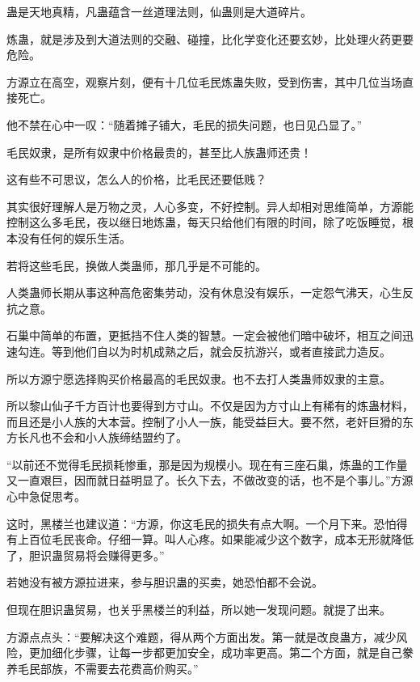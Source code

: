 
\begin{this_body}



蛊是天地真精，凡蛊蕴含一丝道理法则，仙蛊则是大道碎片。

炼蛊，就是涉及到大道法则的交融、碰撞，比化学变化还要玄妙，比处理火药更要危险。

方源立在高空，观察片刻，便有十几位毛民炼蛊失败，受到伤害，其中几位当场直接死亡。

他不禁在心中一叹：“随着摊子铺大，毛民的损失问题，也日见凸显了。”

毛民奴隶，是所有奴隶中价格最贵的，甚至比人族蛊师还贵！

这有些不可思议，怎么人的价格，比毛民还要低贱？

其实很好理解人是万物之灵，人心多变，不好控制。异人却相对思维简单，方源能控制这么多毛民，夜以继日地炼蛊，每天只给他们有限的时间，除了吃饭睡觉，根本没有任何的娱乐生活。

若将这些毛民，换做人类蛊师，那几乎是不可能的。

人类蛊师长期从事这种高危密集劳动，没有休息没有娱乐，一定怨气沸天，心生反抗之意。

石巢中简单的布置，更抵挡不住人类的智慧。一定会被他们暗中破坏，相互之间迅速勾连。等到他们自以为时机成熟之后，就会反抗游兴，或者直接武力造反。

所以方源宁愿选择购买价格最高的毛民奴隶。也不去打人类蛊师奴隶的主意。

所以黎山仙子千方百计也要得到方寸山。不仅是因为方寸山上有稀有的炼蛊材料，而且还是小人族的大本营。控制了小人一族，能受益巨大。要不然，老奸巨猾的东方长凡也不会和小人族缔结盟约了。

“以前还不觉得毛民损耗惨重，那是因为规模小。现在有三座石巢，炼蛊的工作量又一直艰巨，因而就日益明显了。长久下去，不做改变的话，也不是个事儿。”方源心中急促思考。

这时，黑楼兰也建议道：“方源，你这毛民的损失有点大啊。一个月下来。恐怕得有上百位毛民丧命。仔细一算。叫人心疼。如果能减少这个数字，成本无形就降低了，胆识蛊贸易将会赚得更多。”

若她没有被方源拉进来，参与胆识蛊的买卖，她恐怕都不会说。

但现在胆识蛊贸易，也关乎黑楼兰的利益，所以她一发现问题。就提了出来。

方源点点头：“要解决这个难题，得从两个方面出发。第一就是改良蛊方，减少风险，更加细化步骤，让每一步都更加安全，成功率更高。第二个方面，就是自己豢养毛民部族，不需要去花费高价购买。”


\end{this_body}

